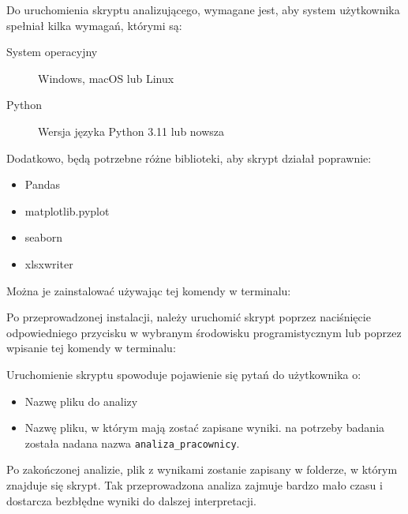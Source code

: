         \par Do uruchomienia skryptu analizującego, wymagane jest, aby system użytkownika spełniał kilka wymagań, którymi są:

        \begin{description}
            \item[System operacyjny] Windows, macOS lub Linux
            \item[Python] Wersja języka Python 3.11 lub nowsza 
        \end{description}
        Dodatkowo, będą potrzebne różne biblioteki, aby skrypt działał poprawnie:
        \begin{itemize}
            \item Pandas
            \item matplotlib.pyplot
            \item seaborn
            \item xlsxwriter
        \end{itemize}
        Można je zainstalować używając tej komendy w terminalu:
        
        

        \par Po przeprowadzonej instalacji, należy uruchomić skrypt poprzez naciśnięcie odpowiedniego przycisku w wybranym środowisku programistycznym lub poprzez wpisanie tej komendy w terminalu:

        

        \par Uruchomienie skryptu spowoduje pojawienie się pytań do użytkownika o:
        \begin{itemize}
            \item Nazwę pliku do analizy
            \item Nazwę pliku, w którym mają zostać zapisane wyniki. na potrzeby badania została nadana nazwa \verb|analiza_pracownicy|.
        \end{itemize}
        Po zakończonej analizie, plik z wynikami zostanie zapisany w folderze, w którym znajduje się skrypt. Tak przeprowadzona analiza zajmuje bardzo mało czasu i dostarcza bezbłędne wyniki do dalszej interpretacji.

